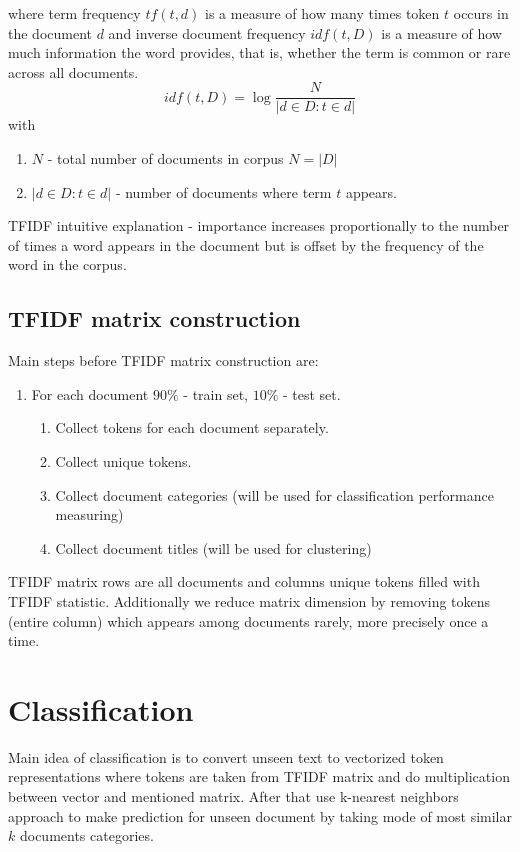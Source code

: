 \documentclass{article}
\begin{document}
where term frequency $ tf(t, d)$  is a measure of how many times token $t$ occurs in the document $d$ and inverse document frequency $idf(t, D) $ is a measure of how much information the word provides, that is, whether the term is common or rare across all documents.
\begin{equation}
idf(t, D) = \log \frac{N}{|d\in D : t \in d|}
\label{idf}
\end{equation}
with 
\begin{enumerate}
\item $N$ - total number of documents in corpus $N = |D|$
\item $|d\in D : t \in d|$ - number of documents where term $t$ appears.
\end{enumerate}
TFIDF intuitive explanation -  importance increases proportionally to the number of times a word appears in the document but is offset by the frequency of the word in the corpus.

\subsection{TFIDF matrix construction}
Main steps before TFIDF matrix construction are:
\begin{enumerate}
\item For each document $90\%$ - train set, $10\%$ - test set.
\begin{enumerate}
\item Collect tokens for each document separately.
\item Collect unique tokens.
\item Collect document categories (will be used for classification performance measuring)
\item Collect document titles (will be used for clustering)
\end{enumerate}
\end{enumerate}

TFIDF matrix rows are all documents and columns unique tokens filled with  TFIDF statistic. Additionally we reduce matrix dimension by removing tokens (entire column) which appears among documents rarely, more precisely  once a time.
\section{Classification}
Main idea of classification is to convert unseen text to vectorized token representations where tokens are taken from TFIDF matrix and do multiplication between vector and mentioned matrix. After that use k-nearest neighbors approach to make prediction for unseen document by taking mode of most similar $k$ documents categories.
\end{document}

